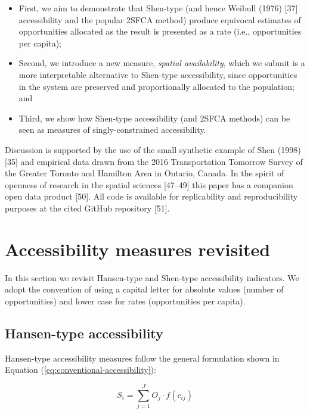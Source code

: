 \documentclass[10pt,letterpaper]{article}
\begin{document}
\begin{itemize}
\item
  First, we aim to demonstrate that Shen-type (and hence Weibull (1976)
  {[}37{]} accessibility and the popular 2SFCA method) produce equivocal
  estimates of opportunities allocated as the result is presented as a
  rate (i.e., opportunities per capita);
\item
  Second, we introduce a new measure, \emph{spatial availability}, which
  we submit is a more interpretable alternative to Shen-type
  accessibility, since opportunities in the system are preserved and
  proportionally allocated to the population; and
\item
  Third, we show how Shen-type accessibility (and 2SFCA methods) can be
  seen as measures of singly-constrained accessibility.
\end{itemize}

Discussion is supported by the use of the small synthetic example of
Shen (1998) {[}35{]} and empirical data drawn from the 2016
Transportation Tomorrow Survey of the Greater Toronto and Hamilton Area
in Ontario, Canada. In the spirit of openness of research in the spatial
sciences {[}47--49{]} this paper has a companion open data product
{[}50{]}. All code is available for replicability and reproducibility
purposes at the cited GitHub repository {[}51{]}.

\hypertarget{background}{%
\section{Accessibility measures revisited}\label{background}}

In this section we revisit Hansen-type and Shen-type accessibility
indicators. We adopt the convention of using a capital letter for
absolute values (number of opportunities) and lower case for rates
(opportunities per capita).

\hypertarget{hansen-type-accessibility}{%
\subsection{Hansen-type accessibility}\label{hansen-type-accessibility}}

Hansen-type accessibility measures follow the general formulation shown
in Equation (\ref{eq:conventional-accessibility}):

\begin{equation}
\label{eq:conventional-accessibility}
S_i = \sum_{j=1}^JO_j \cdot f(c_{ij})
\end{equation}
\end{document}
